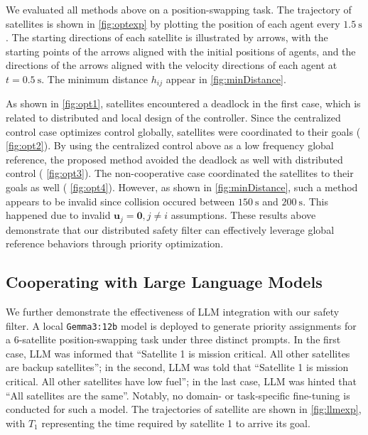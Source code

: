 \documentclass{ifacconf}
\begin{document}
\par We evaluated all methods above on a position-swapping task.
The trajectory of satellites is shown in {\figurename} \ref{fig:optexp} by plotting the position of each agent every $1.5~\mathrm{s}$. The starting directions of each satellite is illustrated by arrows, with the starting points of the arrows aligned with the initial positions of agents, and the directions of the arrows aligned with the velocity directions of each agent at $t = 0.5~\mathrm{s}$.
The minimum distance $h_{ij}$ appear in {\figurename} \ref{fig:minDistance}.

\par As shown in {\figurename} \ref{fig:opt1}, satellites encountered a deadlock in the first case, which is related to distributed and local design of the controller.
Since the centralized control case optimizes control globally, satellites were coordinated to their goals ({\figurename} \ref{fig:opt2}).
By using the centralized control above as a low frequency global reference, the proposed method avoided the deadlock as well with distributed control ({\figurename} \ref{fig:opt3}).
The non-cooperative case coordinated the satellites to their goals as well ({\figurename} \ref{fig:opt4}). 
However, as shown in {\figurename} \ref{fig:minDistance}, such a method appears to be invalid since collision occured between $150~\mathrm{s}$ and $200~\mathrm{s}$.
This happened due to invalid $\boldsymbol{u}_j = \boldsymbol{0}, j \neq i$ assumptions.
These results above demonstrate that our distributed safety filter can effectively leverage global reference behaviors through priority optimization.

\subsection{Cooperating with Large Language Models}
\par We further demonstrate the effectiveness of LLM integration with our safety filter. A local \texttt{Gemma3:12b} \cite[]{gemma2024} model is deployed to generate priority assignments for a 6-satellite position-swapping task under three distinct prompts. 
In the first case, LLM was informed that ``Satellite 1 is mission critical. All other satellites are backup satellites''; 
in the second, LLM was told that ``Satellite 1 is mission critical. All other satellites have low fuel'';
in the last case, LLM was hinted that ``All satellites are the same''.
Notably, no domain- or task-specific fine-tuning is conducted for such a model.
The trajectories of satellite are shown in {\figurename} \ref{fig:llmexp}, with $T_1$ representing the time required by satellite 1 to arrive its goal.
\end{document}
